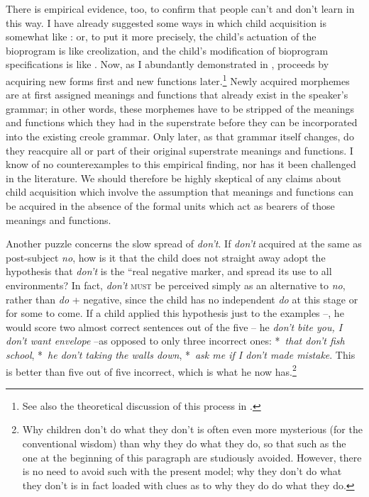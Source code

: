 There is empirical evidence, too, to confirm that people can't and don't learn in this way. I have already suggested some ways in which child acquisition is somewhat like : or, to put it more precisely, the child's actuation of the bioprogram is like creoliza\-tion, and the child's modification of bioprogram specifications is like . Now, as I abundantly demonstrated in \citet{Bickerton1975},  proceeds by acquiring new forms first and new functions later.\footnote{See also the theoretical discussion of this process in \citet{Bickerton1980}.} Newly acquired morphemes are at first assigned
meanings and functions that already exist in the speaker's grammar; in other words, these morphemes have to be stripped of the meanings and functions which they had in the superstrate before they can be incorporated into the existing creole grammar. Only later, as that grammar itself changes, do they reacquire all or part of their original superstrate meanings and functions. I know of no counterexamples to this empirical finding, nor has it been challenged in the literature. We should therefore be highly skeptical of any claims about child acquisition which involve the assumption that meanings and functions can be acquired in the absence of the formal units which act as bearers of those meanings and functions.

Another puzzle concerns the slow spread of \textit{don't}. If \textit{don't} acquired at the same  as post-subject \textit{no}, how is it that the child does not straight away adopt the hypothesis that \textit{don't} is the ``real negative marker, and spread its use to all environments? In fact, \textit{don't} \textsc{must} be perceived simply as an alternative to \textit{no}, rather than \textit{do} + negative, since the child has no independent \textit{do} at this stage or for some  to come. If a child applied this hypothesis just to the examples --, he would score two almost correct sentences out of the five -- he \textit{don't bite you, I don't want envelope} --as opposed to only three incorrect ones: *~\textit{that don't fish school}, *~\textit{he don't taking the walls down}, *~\textit{ask me if I don't made mistake}. This is better than five out of five incorrect, which is what he now has.\footnote{Why children don't do what they don't is often even more mysterious (for the conventional wisdom) than why they do what they do, so that  such as the one at the beginning of this paragraph are studiously avoided. However, there is no need to avoid such  with the present model; why they don't do what they don't is in fact loaded with clues as to why they do do what they do.}

